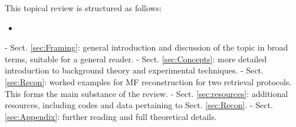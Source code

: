 This topical review is structured as follows:

\begin{itemize}
\item 
\end{itemize}
- Sect. \ref{sec:Framing}: general introduction and discussion of the topic in broad terms, suitable for a general reader.
- Sect. \ref{sec:Concepts}: more detailed introduction to background theory and experimental techniques.
- Sect. \ref{sec:Recon}: worked examples for MF reconstruction for two retrieval protocols. This forms the main substance of the review.
- Sect. \ref{sec:resources}: additional resources, including codes and data pertaining to Sect. \ref{sec:Recon}.
- Sect. \ref{sec:Appendix}: further reading and full theoretical details.